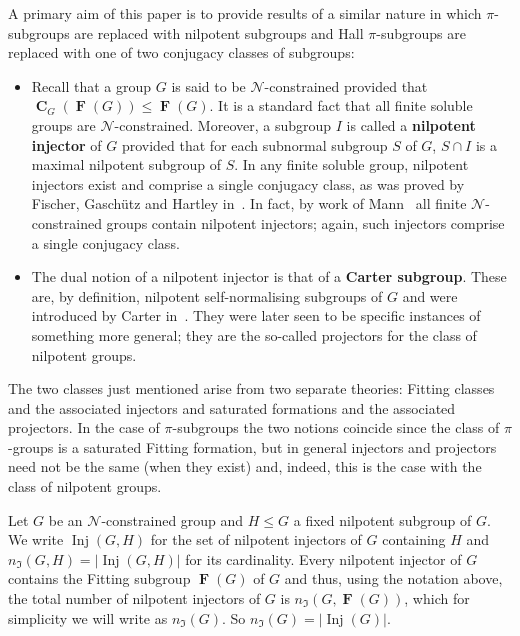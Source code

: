 \documentclass[a4paper,12pt,reqno]{amsart}
\numberwithin{equation}{section}
\DeclareMathOperator{\fitt}{\mathbf{F}}
\DeclareMathOperator{\inj}{Inj}
\DeclareMathOperator{\cent}{\mathbf{C}}
\newcommand{\card}[1]{\left\lvert{#1}\right\rvert}
\renewcommand{\leq}{\leqslant}
\begin{document}
A primary aim of this paper is to provide results of a similar nature in which $\pi$-subgroups are replaced with nilpotent subgroups 
and Hall $\pi$-subgroups are replaced with one of two conjugacy classes of subgroups:
\begin{itemize}
\item Recall that a group $G$ is said to be $\mathcal{N}$-constrained
provided that $\cent_G(\fitt(G)) \leq \fitt(G)$. 
It is a standard fact that all finite soluble groups are $\mathcal{N}$-constrained.
Moreover, a subgroup $I$ is called a \textbf{nilpotent injector} of $G$
provided that for each subnormal subgroup $S$ of $G$,
$S \cap I$ is a maximal nilpotent subgroup of $S$.  In any finite soluble group,
nilpotent injectors exist and comprise a single conjugacy class,
as was proved by Fischer, Gasch\"{u}tz and Hartley in~\cite{injectoren}.
In fact, by work of Mann~\cite{mann_injectors} 
all finite $\mathcal{N}$-constrained groups contain nilpotent injectors; 
again, such injectors comprise a single conjugacy class. 


\item The dual notion of a nilpotent injector is that of a \textbf{Carter subgroup}. 
These are, by definition, nilpotent self-normalising subgroups of $G$ and  were
introduced by Carter in~\cite{Carter}. 
They were later seen to be  specific instances of something more general;
they are the so-called projectors for the class of nilpotent groups.
\end{itemize}

The two classes just mentioned arise from two separate theories:
Fitting classes and the associated injectors and saturated formations
and the associated projectors. 
In the case of $\pi$-subgroups the two notions coincide since the
class of $\pi$-groups is a saturated Fitting formation,
but in general injectors and projectors need not be the same (when they exist) and, indeed, this is the case
with the class of nilpotent groups.

Let $G$ be an $\mathcal{N}$-constrained group  and  $H\leq G$  a fixed nilpotent subgroup of $G$. We write $\inj(G,H)$ for the set of nilpotent injectors of $G$ containing $H$ and  $n_\mathfrak{I}(G,H) = \card{\inj(G, H)}$  for its cardinality.
Every nilpotent injector of $G$ contains the Fitting subgroup $\fitt(G)$ of $G$ and thus, using the notation above,  the total number of nilpotent injectors of $G$ is $n_\mathfrak{I}(G, \fitt(G))$, which  for simplicity we will write  as  $n_\mathfrak{I}(G)$. So   $n_\mathfrak{I}(G) = \card{\inj(G)}$.
\end{document}
